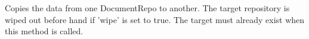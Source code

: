 Copies the data from one DocumentRepo to another. The target repository is wiped out before hand if 'wipe' is set to true. The target must already exist when this method is called.
